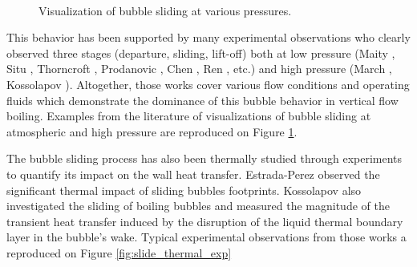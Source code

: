 \begin{figure}[H]

\begin{center}

\\

\end{center}

\caption{Visualization of bubble sliding at various pressures.}
\label{fig:slide_exp_vis}
\end{figure}


This behavior has been supported by many experimental observations who clearly observed three stages (departure, sliding, lift-off) both at low pressure (Maity \cite{maity_effect_2000}, Situ \cite{situ_bubble_2005}, Thorncroft \cite{thorncroft_experimental_1998}, Prodanovic \cite{prodanovic_bubble_2002}, Chen \cite{chen_prediction_2012}, Ren \cite{ren_development_2020}, etc.) and high pressure (March \cite{march_caracterisation_1999}, Kossolapov \cite{kossolapov_experimental_2021}). Altogether, those works cover various flow conditions and operating fluids which demonstrate the dominance of this bubble behavior in vertical flow boiling. Examples from the literature of visualizations of bubble sliding at atmospheric and high pressure are reproduced on Figure \ref{fig:slide_exp_vis}.

\npar

The bubble sliding process has also been thermally studied through experiments to quantify its impact on the wall heat transfer. Estrada-Perez \etal \cite{estrada-perez_time-resolved_2018} observed the significant thermal impact of sliding bubbles footprints. Kossolapov \cite{kossolapov_experimental_2021} also investigated the sliding of boiling bubbles and measured the magnitude of the transient heat transfer induced by the disruption of the liquid thermal boundary layer in the bubble's wake. Typical experimental observations from those works a reproduced on Figure \ref{fig:slide_thermal_exp}

